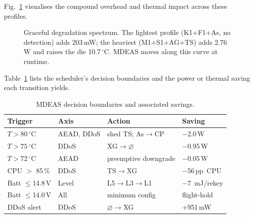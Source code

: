 \documentclass[conference]{IEEEtran}
\newcommand{\mdeas}{\textsc{MDEAS}}
\newcommand{\pp}{\,pp}                          %
\begin{document}
Fig.~\ref{fig:degrade} visualises the compound overhead and thermal
impact across these profiles.

\begin{figure}[t]
\centering
{}
\caption{Graceful degradation spectrum.  The lightest profile
  (K1+F1+As, no detection) adds 203\,mW; the heaviest
  (M1+S1+AG+TS) adds 2.76\,W and raises the die 10.7\,$^\circ$C.
  \mdeas{} moves along this curve at runtime.}
\label{fig:degrade}
\end{figure}

Table~\ref{tab:scheduler} lists the scheduler's decision boundaries
and the power or thermal saving each transition yields.

\begin{table}[t]
\centering
\caption{\mdeas{} decision boundaries and associated savings.}
\label{tab:scheduler}
\footnotesize
\setlength{\tabcolsep}{2pt}
\begin{tabular}{@{}l l l l@{}}
\toprule
\textbf{Trigger} & \textbf{Axis} & \textbf{Action} & \textbf{Saving} \\
\midrule
$T > 80\,^\circ$C & AEAD, DDoS & shed TS; As$\to$CP & $-$2.0\,W \\
$T > 75\,^\circ$C & DDoS & XG$\to$$\varnothing$ & $-$0.95\,W \\
$T > 72\,^\circ$C & AEAD & preemptive downgrade & $-$0.05\,W \\
CPU $>$ 85\,\% & DDoS & TS$\to$XG & $-$56\pp\ CPU \\
Batt $\leq$14.8\,V & Level & L5$\to$L3$\to$L1 & $-$7\ mJ/rekey \\
Batt $\leq$14.0\,V & All & minimum config & flight-hold \\
DDoS alert & DDoS & $\varnothing$$\to$XG & +951\,mW \\
\bottomrule
\end{tabular}
\end{table}
\end{document}

